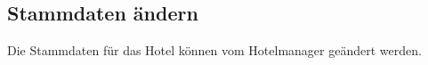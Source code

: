 \documentclass[../SubfileFeatures.tex]{subfiles}
\begin{document}
    \subsection{Stammdaten ändern}
	Die Stammdaten für das Hotel können vom Hotelmanager geändert werden.
\end{document}
